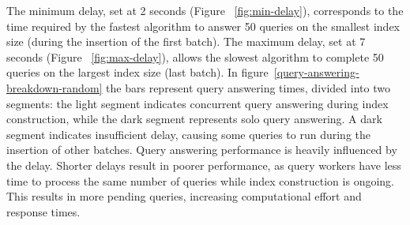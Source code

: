 The minimum delay, set at 2 seconds (Figure ~\ref{fig:min-delay}), corresponds to the 
time required by the fastest algorithm to answer 50 queries on the smallest index size 
(during the insertion of the first batch). The maximum delay, set at 7 seconds
(Figure ~\ref{fig:max-delay}), allows the slowest algorithm to complete 50 queries on the
largest index size (last batch). In figure~\ref{query-answering-breakdown-random} the bars represent query answering times,
divided into two segments: the light segment indicates concurrent query answering
during index construction, while the dark segment represents solo query answering.
A dark segment indicates insufficient delay, causing some queries to run during
the insertion of other batches.
%
Query answering performance is heavily influenced by the delay. Shorter delays result
in poorer performance, as query workers have less time to process the same number
of queries while index construction is ongoing. This results in more pending queries,
increasing computational effort and response times.





